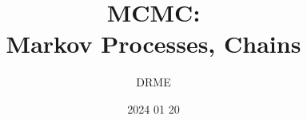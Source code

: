 \documentclass{beamer}
\begin{document}
\title{MCMC:\\Markov Processes, Chains}
\author{DRME}
\date{2024 01 20}


\frame{\titlepage}





\end{document}

